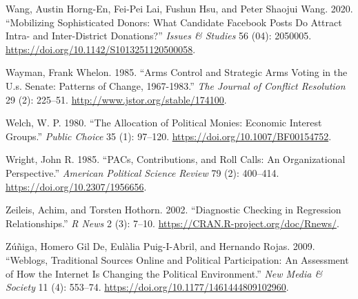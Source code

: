 \documentclass[12pt,]{article}
\begin{document}
\leavevmode\hypertarget{ref-wang2020}{}%
Wang, Austin Horng-En, Fei-Pei Lai, Fushun Hsu, and Peter Shaojui Wang.
2020. ``Mobilizing Sophisticated Donors: What Candidate Facebook Posts
Do Attract Intra- and Inter-District Donations?'' \emph{Issues \&
Studies} 56 (04): 2050005.
\url{https://doi.org/10.1142/S1013251120500058}.

\leavevmode\hypertarget{ref-wayman1985}{}%
Wayman, Frank Whelon. 1985. ``Arms Control and Strategic Arms Voting in
the U.s. Senate: Patterns of Change, 1967-1983.'' \emph{The Journal of
Conflict Resolution} 29 (2): 225--51.
\url{http://www.jstor.org/stable/174100}.

\leavevmode\hypertarget{ref-welch1980}{}%
Welch, W. P. 1980. ``The Allocation of Political Monies: Economic
Interest Groups.'' \emph{Public Choice} 35 (1): 97--120.
\url{https://doi.org/10.1007/BF00154752}.

\leavevmode\hypertarget{ref-wright1985}{}%
Wright, John R. 1985. ``PACs, Contributions, and Roll Calls: An
Organizational Perspective.'' \emph{American Political Science Review}
79 (2): 400--414. \url{https://doi.org/10.2307/1956656}.

\leavevmode\hypertarget{ref-lmtest}{}%
Zeileis, Achim, and Torsten Hothorn. 2002. ``Diagnostic Checking in
Regression Relationships.'' \emph{R News} 2 (3): 7--10.
\url{https://CRAN.R-project.org/doc/Rnews/}.

\leavevmode\hypertarget{ref-dezuniga2009}{}%
Zúñiga, Homero Gil De, Eulàlia Puig-I-Abril, and Hernando Rojas. 2009.
``Weblogs, Traditional Sources Online and Political Participation: An
Assessment of How the Internet Is Changing the Political Environment.''
\emph{New Media \& Society} 11 (4): 553--74.
\url{https://doi.org/10.1177/1461444809102960}.





\newpage
\singlespacing 
\end{document}

